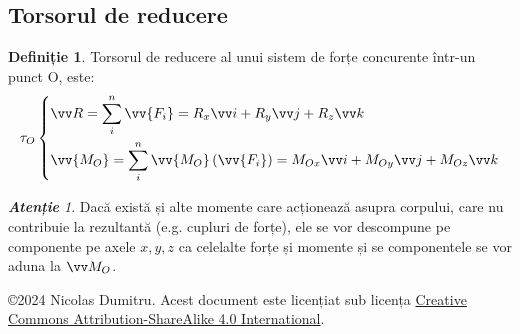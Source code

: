 \documentclass[a4paper]{article}
\theoremstyle{definition}
\newtheorem{definition}{Definiție}[section]
\theoremstyle{plain}%
\theoremstyle{remark}
\newtheorem*{remark}{\textbf{Atenție}}
\begin{document}
\subsection{Torsorul de reducere}
\begin{definition}
	Torsorul de reducere al unui sistem de forțe concurente într-un punct O, este:
	\begin{equation*}
		\tau_O \left\{
		\begin{aligned}
            & \vv R = \sum_i^n \vv{F_i} = R_x \vv i + R_y \vv j + R_z \vv k \\
            & \vv{M_O} = \sum_i^n \vv{M_O}\left(\vv{F_i}\right) = M_{Ox} \vv i + M_{Oy} \vv j + M_{Oz} \vv k \\
		\end{aligned}
		\right.
	\end{equation*}
\end{definition}

\begin{remark}
    Dacă există și alte momente care acționează asupra corpului, care nu contribuie la rezultantă (e.g. cupluri de forțe), ele se vor descompune pe componente pe axele \(x,y, z\) ca celelalte forțe și momente și se componentele se vor aduna la \(\vv M_O\).
\end{remark}

\begin{flushright}
	\copyright 2024 Nicolas Dumitru.
	Acest document este licențiat sub licența \href{https://creativecommons.org/licenses/by-sa/4.0/}{Creative Commons Attribution-ShareAlike 4.0 International}.

\end{flushright}
\end{document}
